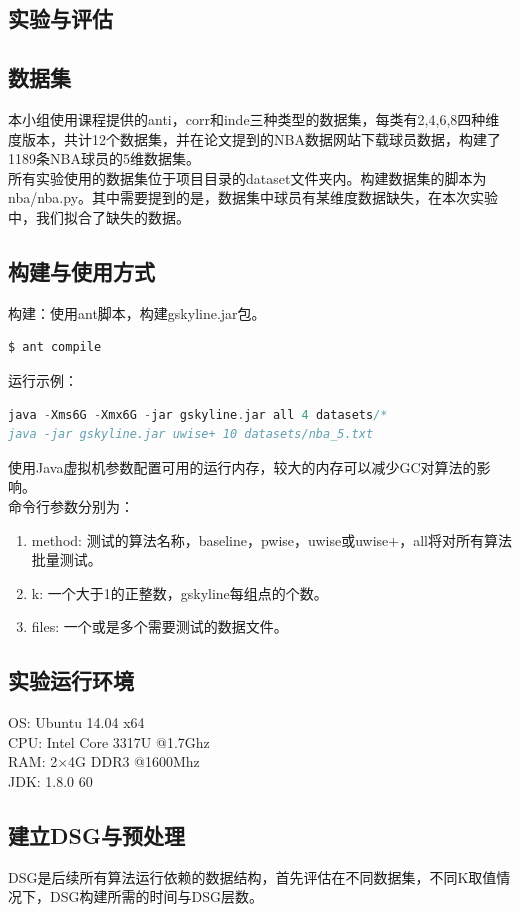 \documentclass{article}
\begin{document}
\begin{CJK}{UTF8}{gbsn}
\section{实验与评估}
\subsection{数据集}
本小组使用课程提供的anti，corr和inde三种类型的数据集，每类有2,4,6,8四种维度版本，共计12个数据集，并在论文提到的NBA数据网站下载球员数据，构建了1189条NBA球员的5维数据集。\\
所有实验使用的数据集位于项目目录的dataset文件夹内。构建数据集的脚本为nba/nba.py。其中需要提到的是，数据集中球员有某维度数据缺失，在本次实验中，我们拟合了缺失的数据。
\subsection{构建与使用方式}
构建：使用ant脚本，构建gskyline.jar包。\\
\begin{lstlisting}[language=C]
$ ant compile
\end{lstlisting}
运行示例：
\begin{lstlisting}[language=C]
java -Xms6G -Xmx6G -jar gskyline.jar all 4 datasets/*
java -jar gskyline.jar uwise+ 10 datasets/nba_5.txt
\end{lstlisting}
使用Java虚拟机参数配置可用的运行内存，较大的内存可以减少GC对算法的影响。\\
命令行参数分别为：\\
\begin{enumerate}
	\item method: 测试的算法名称，baseline，pwise，uwise或uwise+，all将对所有算法批量测试。
	\item k: 一个大于1的正整数，gskyline每组点的个数。
	\item files: 一个或是多个需要测试的数据文件。
\end{enumerate}
\subsection{实验运行环境}
OS: Ubuntu 14.04 x64\\
CPU: Intel Core 3317U @1.7Ghz\\
RAM: 2×4G DDR3 @1600Mhz\\
JDK: 1.8.0 60
\subsection{建立DSG与预处理}
DSG是后续所有算法运行依赖的数据结构，首先评估在不同数据集，不同K取值情况下，DSG构建所需的时间与DSG层数。\\


\end{CJK}
\end{document}
